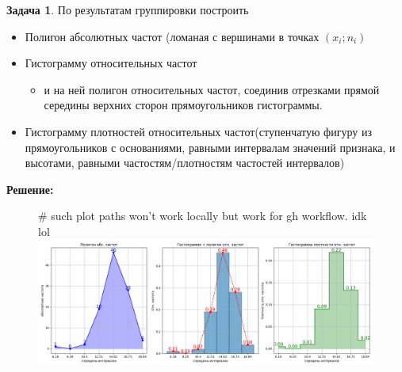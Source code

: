 \documentclass[a4paper,12pt]{article}
\theoremstyle{definition}
\newtheorem{problem}{Задача}\setlength{\parindent}{0pt}
\newenvironment{solution}
{\begin{shaded}\textbf{Решение:}\par\setlength{\parindent}{0pt}}
{\end{shaded}}
\newenvironment{answer}
{\par\noindent\textbf{Ответ:} }
{\par}
\begin{document}
\vspace{8pt}
\begin{problem}
    По результатам группировки построить 
    \begin{itemize}
        \item Полигон абсолютных частот (ломаная с вершинами в точках \((x_i; n_i)\)
        \item Гистограмму относительных частот
        \begin{itemize}
            \item и на ней полигон относительных частот, соединив отрезками прямой 
            середины верхних сторон прямоугольников гистограммы.
        \end{itemize}
        \item Гистограмму плотностей относительных частот(ступенчатую фигуру
        из прямоугольников с основаниями, равными интервалам значений признака, и
        высотами, равными частостям/плотностям частостей интервалов)
    \end{itemize}
    
        \begin{solution}
            \begin{figure}[H]
                \centering
                # such plot paths won't work locally but work for gh workflow. idk lol
                \includegraphics[width=1\textwidth]{plots/1.1.4.png}
            \end{figure}
            
        \end{solution}
    
            
    
    \end{problem}
\end{document}
